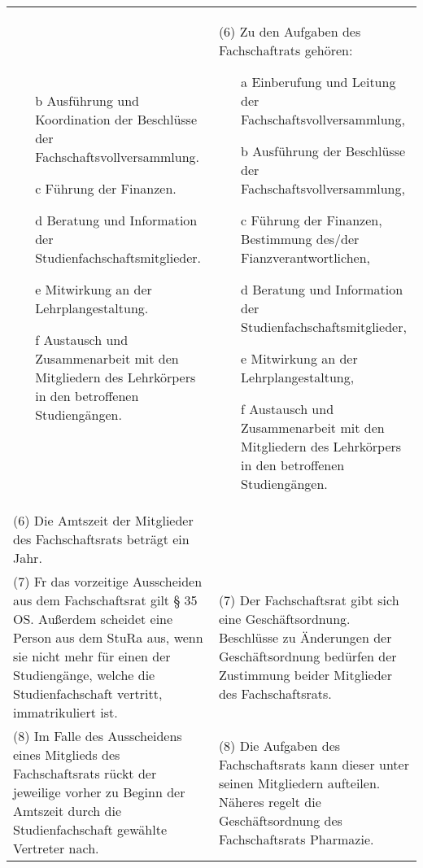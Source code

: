 {\begin{longtable}{|p{7.5cm}|p{7.5cm}|}
\begin{enumerate}
            \item[b] Ausführung und Koordination der Beschlüsse der Fachschaftsvollversammlung.
            \item[c] Führung der Finanzen.
            \item[d] Beratung und Information der Studienfachschaftsmitglieder.
            \item[e] Mitwirkung an der Lehrplangestaltung.
            \item[f] Austausch und Zusammenarbeit mit den Mitgliedern des Lehrkörpers in den betroffenen Studiengängen.
        \end{enumerate}&
        (6) Zu den Aufgaben des Fachschaftrats gehören:
        \begin{enumerate}
            \item[a] Einberufung und Leitung der Fachschaftsvollversammlung,
            \item[b] Ausführung der Beschlüsse der Fachschaftsvollversammlung,
            \item[c] Führung der Finanzen, Bestimmung des/der Fianzverantwortlichen,
            \item[d] Beratung und Information der Studienfachschaftsmitglieder,
            \item[e] Mitwirkung an der Lehrplangestaltung,
            \item[f] Austausch und Zusammenarbeit mit den Mitgliedern  des  Lehrkörpers  in  den  betroffenen Studiengängen. 
        \end{enumerate}\\
        (6) Die Amtszeit der Mitglieder des Fachschaftsrats beträgt ein Jahr.& \\
        (7) Fr das vorzeitige Ausscheiden aus dem Fachschaftsrat gilt § 35 OS. Außerdem scheidet eine Person
        aus dem StuRa aus, wenn sie nicht mehr für einen der Studiengänge, welche die Studienfachschaft
        vertritt, immatrikuliert ist.&
        (7) Der Fachschaftsrat gibt sich eine Geschäftsordnung. Beschlüsse zu Änderungen der Geschäftsordnung
        bedürfen der Zustimmung beider Mitglieder des Fachschaftsrats.\\
        (8) Im Falle des Ausscheidens eines Mitglieds des Fachschaftsrats rückt der jeweilige vorher zu Beginn
        der Amtszeit durch die Studienfachschaft gewählte Vertreter nach.&
        (8) Die  Aufgaben  des  Fachschaftsrats  kann  dieser unter seinen Mitgliedern aufteilen. Näheres regelt
        die Geschäftsordnung des Fachschaftsrats Pharmazie.\\\hline

\end{longtable}}

